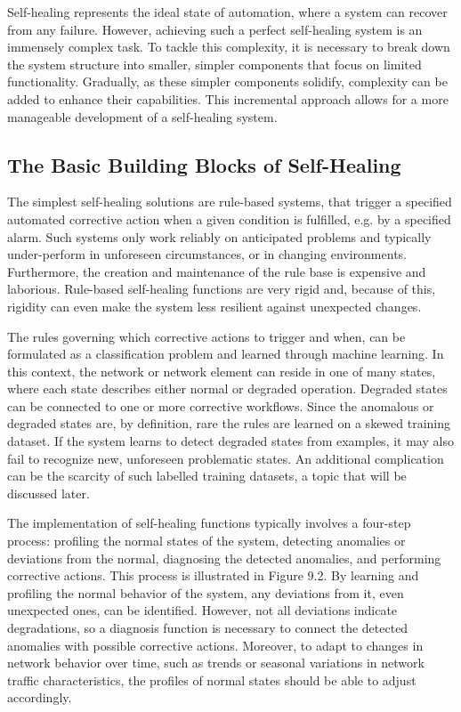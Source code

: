 Self-healing represents the ideal state of automation, where a system can recover from any failure. However, achieving such a perfect self-healing system is an immensely complex task. To tackle this complexity, it is necessary to break down the system structure into smaller, simpler components that focus on limited functionality. Gradually, as these simpler components solidify, complexity can be added to enhance their capabilities. This incremental approach allows for a more manageable development of a self-healing system.

\subsection{The Basic Building Blocks of Self-Healing}
The simplest self-healing solutions are rule-based systems, that trigger a specified automated corrective action when a given condition is fulfilled, e.g. by a specified alarm. Such systems only work reliably on anticipated problems and typically under-perform in unforeseen circumstances, or in changing environments. Furthermore, the creation and maintenance of the rule base is expensive and laborious. Rule-based self-healing functions are very rigid and, because of this, rigidity can even make the system less resilient against unexpected changes\cite{ali2018self}.

The rules governing which corrective actions to trigger and when, can be formulated as a classification problem and learned through machine learning. In this context, the network or network element can reside in one of many states, where each state describes either normal or degraded operation. Degraded states can be connected to one or more corrective workflows. Since the anomalous or degraded states are, by definition, rare the rules are learned on a skewed training dataset. If the system learns to detect degraded states from examples, it may also fail to recognize new, unforeseen problematic states. An additional complication can be the scarcity of such labelled training datasets, a topic that will be discussed later\cite{ali2018self}.

The implementation of self-healing functions typically involves a four-step process: profiling the normal states of the system, detecting anomalies or deviations from the normal, diagnosing the detected anomalies, and performing corrective actions. This process is illustrated in Figure 9.2. By learning and profiling the normal behavior of the system, any deviations from it, even unexpected ones, can be identified. However, not all deviations indicate degradations, so a diagnosis function is necessary to connect the detected anomalies with possible corrective actions. Moreover, to adapt to changes in network behavior over time, such as trends or seasonal variations in network traffic characteristics, the profiles of normal states should be able to adjust accordingly.

